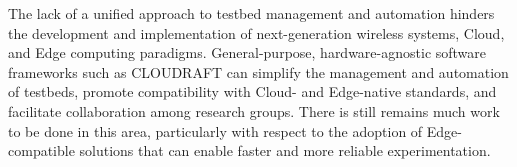 The lack of a unified approach to testbed management and automation hinders the development and implementation of next-generation wireless systems, Cloud, and Edge computing paradigms.
General-purpose, hardware-agnostic software frameworks such as \gls{CLOUDRAFT} can simplify the management and automation of testbeds, promote compatibility with Cloud- and Edge-native standards, and facilitate collaboration among research groups.
There is still remains much work to be done in this area, particularly with respect to the adoption of Edge-compatible solutions that can enable faster and more reliable experimentation.